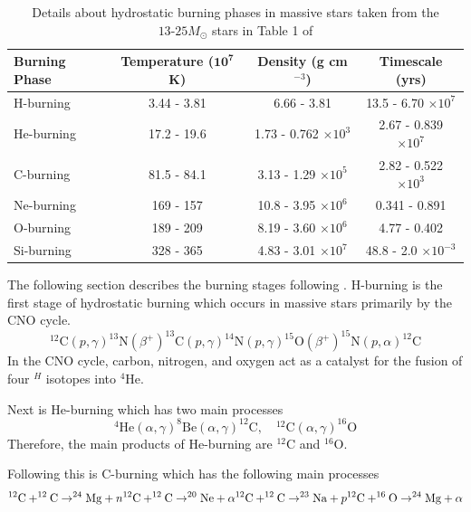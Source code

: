 \begin{table}[H]
\caption{Details about hydrostatic burning phases in massive stars taken from the $13\text{-}25 M_\odot$ stars in Table 1 of \cite{woosleyEvolutionExplosionMassive2002}}
\begin{tabular}{|l|c|c|c|}
    \hline
    \textbf{Burning Phase} & \textbf{Temperature ($\mathbf{10^7}$ K)} & \textbf{Density (g cm$^{-3}$)} & \textbf{Timescale (yrs)} 
    \\ \hline
    H-burning & 3.44 - 3.81 & 6.66 - 3.81 & 13.5 - 6.70 $\times 10^7$ \\ \hline
    He-burning & 17.2 - 19.6 & 1.73 - 0.762 $\times 10^3$  & 2.67 - 0.839 $\times 10^7$ \\ \hline
    C-burning & 81.5 - 84.1 & 3.13 - 1.29 $\times 10^5$ & 2.82 - 0.522 $\times 10^3$ \\ \hline
    Ne-burning & 169 - 157  & 10.8 - 3.95 $\times 10^6$ & 0.341 - 0.891 \\ \hline
    O-burning & 189 - 209  & 8.19 - 3.60 $\times 10^6$ & 4.77 - 0.402 \\ \hline
    Si-burning &  328 - 365 & 4.83 - 3.01 $\times 10^7$ & 48.8 - 2.0 $\times 10^{-3}$\\
    \hline
\end{tabular}
\end{table}

The following section describes the burning stages following \cite{woosleyEvolutionExplosionMassive2002, iliadisNuclearPhysicsStars2015}.
H-burning is the first stage of hydrostatic burning which occurs in massive stars primarily by the CNO cycle.
\[
    ^{12}\mathrm{C}(p,\gamma)^{13}\mathrm{N}(\beta^+)^{13}\mathrm{C}(p,\gamma)^{14}\mathrm{N}(p,\gamma)^{15}\mathrm{O}(\beta^+)^{15}\mathrm{N}(p,\alpha)^{12}\mathrm{C}
\]
In the CNO cycle, carbon, nitrogen, and oxygen act as a catalyst for the fusion of four $^{H}$ isotopes into $^{4}\mathrm{He}$.

Next is He-burning which has two main processes
\[
    ^{4}\mathrm{He}(\alpha,\gamma)^{8}\mathrm{Be}(\alpha,\gamma)^{12}\mathrm{C}, \quad ^{12}\mathrm{C}(\alpha,\gamma)^{16}\mathrm{O}
\]
Therefore, the main products of He-burning are $^{12}\mathrm{C}$ and $^{16}\mathrm{O}$.

Following this is C-burning which has the following main processes
\[
    ^{12}\mathrm{C} + ^{12}\mathrm{C} \rightarrow ^{24}\mathrm{Mg} + n \\
    ^{12}\mathrm{C} + ^{12}\mathrm{C} \rightarrow ^{20}\mathrm{Ne} + \alpha \\
    ^{12}\mathrm{C} + ^{12}\mathrm{C} \rightarrow ^{23}\mathrm{Na} + p \\
    ^{12}\mathrm{C} + ^{16}\mathrm{O} \rightarrow ^{24}\mathrm{Mg} + \alpha \\
\]

